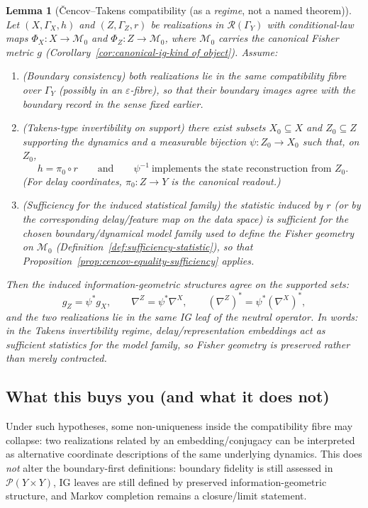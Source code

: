 \documentclass[11pt]{article}
\newtheorem{lemma}{Lemma}
\newcommand{\Rcal}{\mathcal{R}}
\newcommand{\Pcal}{\mathcal{P}}
\newcommand{\Mcal}{\mathcal{M}}
\begin{document}
\begin{lemma}[Čencov--Takens compatibility (as a \emph{regime}, not a named theorem)]
\label{lem:cencov-takens}
Let $(X,\Gamma_X,h)$ and $(Z,\Gamma_Z,r)$ be realizations in
$\Rcal(\Gamma_Y)$ with conditional-law maps
$\Phi_X:X\to\Mcal_0$ and $\Phi_Z:Z\to\Mcal_0$, where $\Mcal_0$ carries
the canonical Fisher metric $g$ (Corollary~\ref{cor:canonical-ig-kind of object}).
Assume:
\begin{enumerate}[label=(\roman*),leftmargin=1.8em]
  \item (\emph{Boundary consistency}) both realizations lie in the same
  compatibility fibre over $\Gamma_Y$ (possibly in an $\varepsilon$-fibre), so
  that their boundary images agree with the boundary record in the sense fixed
  earlier.
  \item (\emph{Takens-type invertibility on support}) there exist subsets
  $X_0\subseteq X$ and $Z_0\subseteq Z$ supporting the dynamics and a measurable
  bijection $\psi:Z_0\to X_0$ such that, on $Z_0$,
  \[
    h = \pi_0\circ r
    \qquad\text{and}\qquad
    \psi^{-1}\ \text{implements the state reconstruction from }Z_0.
  \]
  (For delay coordinates, $\pi_0:Z\to Y$ is the canonical readout.)
  \item (\emph{Sufficiency for the induced statistical family}) the statistic
  induced by $r$ (or by the corresponding delay/feature map on the data space)
  is sufficient for the chosen boundary/dynamical model family used to define
  the Fisher geometry on $\Mcal_0$ (Definition~\ref{def:sufficiency-statistic}),
  so that Proposition~\ref{prop:cencov-equality-sufficiency} applies.
\end{enumerate}
Then the induced information-geometric structures agree on the supported sets:
\[
  g_Z = \psi^\ast g_X,
  \qquad
  \nabla^Z = \psi^\ast \nabla^X,
  \qquad
  (\nabla^Z)^\ast = \psi^\ast (\nabla^X)^\ast,
\]
and the two realizations lie in the same IG leaf of the neutral operator.
In words: \emph{in the Takens invertibility regime, delay/representation
embeddings act as sufficient statistics for the model family, so Fisher geometry
is preserved rather than merely contracted.}
\end{lemma}


\subsection{What this buys you (and what it does not)}
Under such hypotheses, some non-uniqueness inside the compatibility fibre may collapse: two realizations related by an embedding/conjugacy can be interpreted as alternative coordinate descriptions of the same underlying dynamics.
This does \emph{not} alter the boundary-first definitions: boundary fidelity is still assessed in $\Pcal(Y\times Y)$, IG leaves are still defined by preserved information-geometric structure, and Markov completion remains a closure/limit statement.
\end{document}
